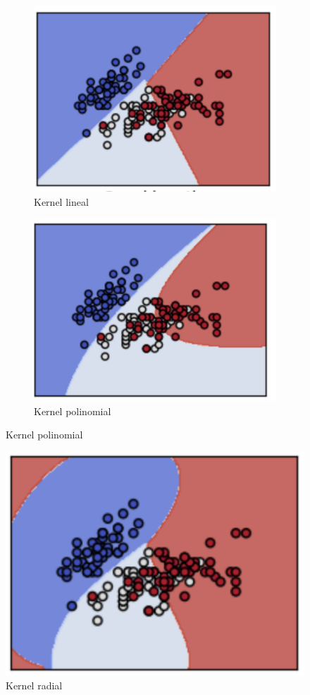 \begin{figure}[h]
\centering
	\begin{subfigure}{.5\textwidth}
	\centering
	\includegraphics[scale=0.7]{imagenes/capitulo5/klineal.png}
	\caption{Kernel lineal}
	\label{fig:cp5:klineal}
	\end{subfigure}%
	\begin{subfigure}{.5\textwidth}
	\centering
	\includegraphics[scale=0.7]{imagenes/capitulo5/kpoli.png}
	\caption{Kernel polinomial}
	\label{fig:cp5:kpoli}
	\end{subfigure}%
\end{figure}

\begin{figure}[h]
\centering
\includegraphics[scale=0.7]{imagenes/capitulo5/krbf.png}
\caption{Kernel radial}
\label{fig:cp5:krbf}
\end{figure}


